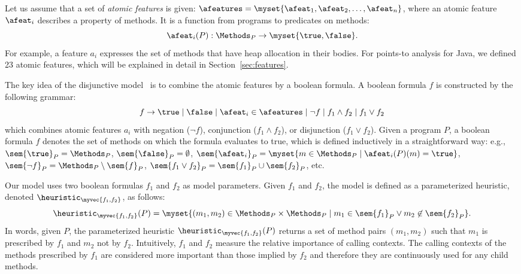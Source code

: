 
Let us assume that a set of {\em atomic features} is given:
$\afeatures = \myset{\afeat_1, \afeat_2, \dots, \afeat_n}$, where an atomic feature $\afeat_i$ describes a property of
methods. It is a function from programs to predicates on
methods:
\[
\afeat_i(P) : \Methods_P \to \myset{\true,\false}.
\]
For example, a feature $a_i$ expresses the set of methods that have
heap allocation in their bodies.
For points-to analysis for Java, we defined 23 atomic features, which
will be explained in detail in Section~\ref{sec:features}.

The key idea of the disjunctive model~\cite{JeJeChOh17} is to combine
the atomic features by a boolean formula. A boolean formula $f$ is
constructed by the following grammar:
\[
f \to \true \mid \false \mid \afeat_i \in \afeatures \mid \neg f \mid
f_1 \land f_2 \mid f_1 \vee f_2
\]
which combines atomic features $a_i$ with negation ($\neg f$),
conjunction ($f_1 \land f_2$), or disjunction ($f_1 \vee f_2$).
Given a program $P$, a boolean formula $f$ denotes the set of methods
on which the formula evaluates to true, which is defined inductively
in a straightforward way: e.g., $\sem{\true}_P = \Methods_P$,
$\sem{\false}_P = \emptyset$, $\sem{\afeat_i}_P = \myset{m \in
  \Methods_P \mid \afeat_i(P)(m) = \true}$, $\sem{\neg f}_P =
\Methods_P \setminus \sem{f}_P$, $\sem{f_1 \vee f_2}_P = \sem{f_1}_P
\cup \sem{f_2}_P$, etc.



Our model uses two boolean formulas $f_1$ and $f_2$ as model
parameters.
Given $f_1$ and $f_2$, the model is defined as a parameterized
heuristic, denoted
$\heuristic_{\myvec{f_1,f_2}}$, as follows:
\[
\heuristic_{\myvec{f_1,f_2}} (P) = \myset{(m_1,m_2) \in \Methods_P \times
  \Methods_P \mid
  m_1 \in \sem{f_1}_P \vee m_2 \not\in \sem{f_2}_P}.
\]
In words, given $P$, the parameterized heuristic
$\heuristic_{\myvec{f_1,f_2}}(P)$ returns a set of method pairs
$(m_1,m_2)$
such that $m_1$ is prescribed by $f_1$ and $m_2$ not by $f_2$.
Intuitively, $f_1$ and $f_2$ measure the relative importance of
calling contexts. The calling contexts of the methods prescribed by
$f_1$ are considered more important than those implied by $f_2$ and therefore they are continuously used for
any child methods.

